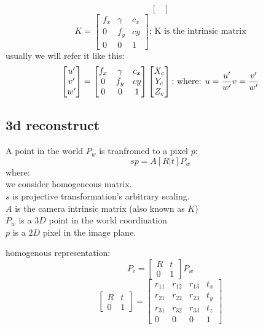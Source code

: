 \documentclass{article}
\begin{document}
\begin{itemize}
$$\begin{bmatrix}
    \end{bmatrix}
    $$
    $$
    K = 
    \begin{bmatrix}
    f_x & \gamma & c_x\\
    0 & f_y & cy \\
    0 & 0 & 1
    \end{bmatrix} 
    \textrm{; K is the intrinsic matrix}
    $$
    usually we will refer it like this:
    $$\begin{bmatrix}
    u'\\v'\\w'
    \end{bmatrix} =
	\begin{bmatrix}
    	f_x & \gamma & c_x\\
    	0 & f_y & cy \\
    	0 & 0 & 1
    \end{bmatrix}     
    \begin{bmatrix}
    	X_c \\ Y_c \\ Z_c
    \end{bmatrix}
    \textrm{; where: }
    u = \frac{u'}{w'}\\
    v = \frac{v'}{w'}
    $$
\end{itemize}
\subsection{3d reconstruct}
A point in the world $P_w$ is tranfromed to a pixel $p$:
$$ sp = A\left[R|t\right]P_w$$
where:\\
we consider homogeneous matrix.\\
$s$ is projective transformation's arbitrary scaling.\\
$A$ is the camera intrinsic matrix (also known as $K$) \\
$P_w$ is a $3D$ point in the world coordination\\
$p$ is a $2D$ pixel in the image plane.

homogenous representation:
$$ P_c = \begin{bmatrix}
R & t\\
0 & 1
\end{bmatrix}P_w
$$ 
$$
\begin{bmatrix}
R & t\\
0 & 1
\end{bmatrix}
=
\begin{bmatrix}
r_11 & r_12 & r_13 & t_x \\
r_21 & r_22 & r_23 & t_y \\
r_31 & r_32 & r_33 & t_z \\
0 & 0 & 0 &1
\end{bmatrix}
$$
\end{document}
